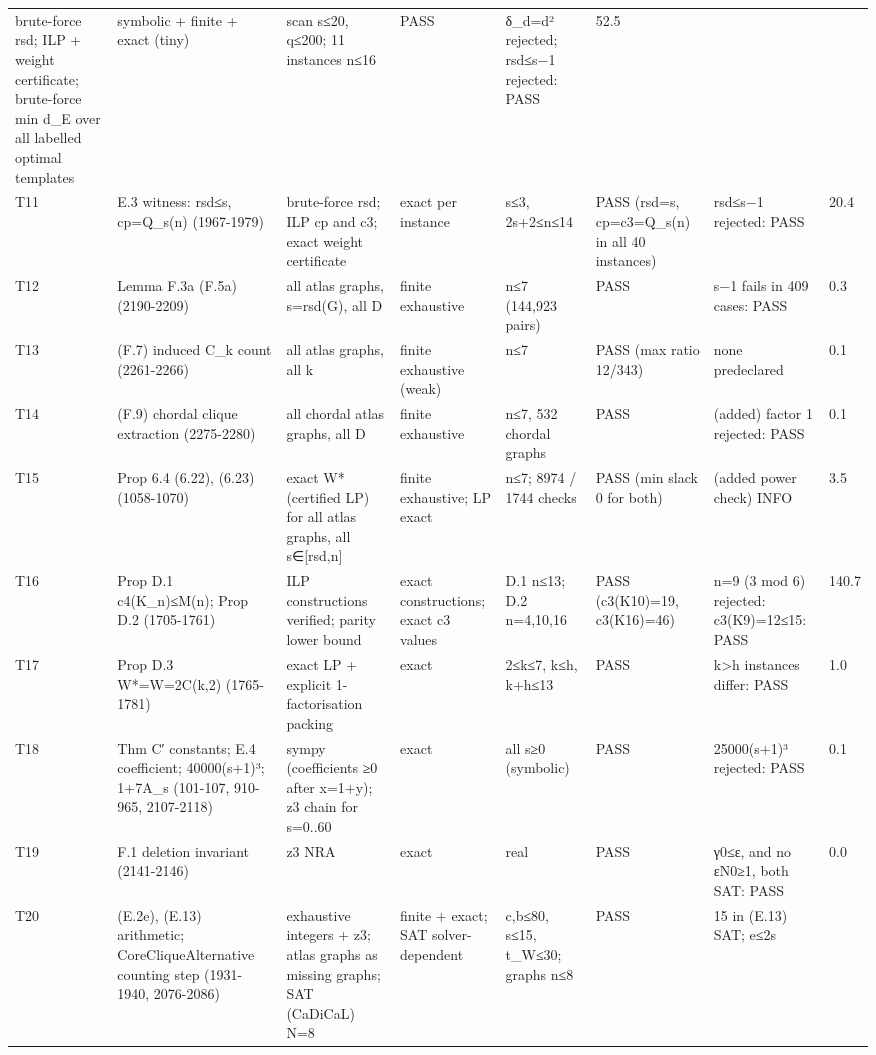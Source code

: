 \documentclass[
]{article}
\newcounter{none} %
\begin{document}
{\begin{longtable}[]{@{}llllllll@{}}
brute-force rsd; ILP + weight certificate; brute-force min d\_E over all
labelled optimal templates & symbolic + finite + exact (tiny) & scan
s≤20, q≤200; 11 instances n≤16 & PASS & δ\_d=d² rejected; rsd≤s−1
rejected: PASS & 52.5 \\
T11 & E.3 witness: rsd≤s, cp=Q\_s(n) (1967-1979) & brute-force rsd; ILP
cp and c3; exact weight certificate & exact per instance & s≤3,
2s+2≤n≤14 & PASS (rsd=s, cp=c3=Q\_s(n) in all 40 instances) & rsd≤s−1
rejected: PASS & 20.4 \\
T12 & Lemma F.3a (F.5a) (2190-2209) & all atlas graphs, s=rsd(G), all D
& finite exhaustive & n≤7 (144,923 pairs) & PASS & s−1 fails in 409
cases: PASS & 0.3 \\
T13 & (F.7) induced C\_k count (2261-2266) & all atlas graphs, all k &
finite exhaustive (weak) & n≤7 & PASS (max ratio 12/343) & none
predeclared & 0.1 \\
T14 & (F.9) chordal clique extraction (2275-2280) & all chordal atlas
graphs, all D & finite exhaustive & n≤7, 532 chordal graphs & PASS &
(added) factor 1 rejected: PASS & 0.1 \\
T15 & Prop 6.4 (6.22), (6.23) (1058-1070) & exact W* (certified LP) for
all atlas graphs, all s∈{[}rsd,n{]} & finite exhaustive; LP exact & n≤7;
8974 / 1744 checks & PASS (min slack 0 for both) & (added power check)
INFO & 3.5 \\
T16 & Prop D.1 c4(K\_n)≤M(n); Prop D.2 (1705-1761) & ILP constructions
verified; parity lower bound & exact constructions; exact c3 values &
D.1 n≤13; D.2 n=4,10,16 & PASS (c3(K10)=19, c3(K16)=46) & n=9 (3 mod 6)
rejected: c3(K9)=12≤15: PASS & 140.7 \\
T17 & Prop D.3 W*=W=2C(k,2) (1765-1781) & exact LP + explicit
1-factorisation packing & exact & 2≤k≤7, k≤h, k+h≤13 & PASS &
k\textgreater h instances differ: PASS & 1.0 \\
T18 & Thm C′ constants; E.4 coefficient; 40000(s+1)³; 1+7A\_s (101-107,
910-965, 2107-2118) & sympy (coefficients ≥0 after x=1+y); z3 chain for
s=0..60 & exact & all s≥0 (symbolic) & PASS & 25000(s+1)³ rejected: PASS
& 0.1 \\
T19 & F.1 deletion invariant (2141-2146) & z3 NRA & exact & real & PASS
& γ0≤ε, and no εN0≥1, both SAT: PASS & 0.0 \\
T20 & (E.2e), (E.13) arithmetic; CoreCliqueAlternative counting step
(1931-1940, 2076-2086) & exhaustive integers + z3; atlas graphs as
missing graphs; SAT (CaDiCaL) N=8 & finite + exact; SAT solver-dependent
& c,b≤80, s≤15, t\_W≤30; graphs n≤8 & PASS & 15 in (E.13) SAT; e≤2s

\end{longtable}}
\end{document}
